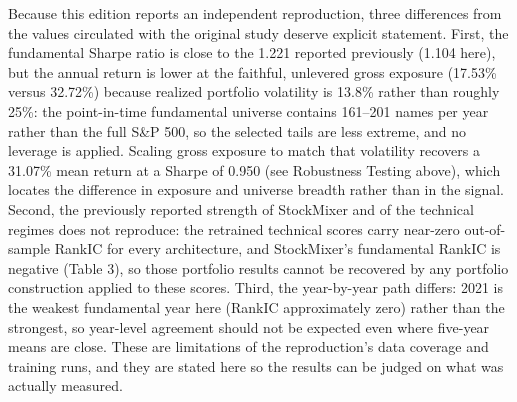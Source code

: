 \documentclass[12pt]{article}
\begin{document}
Because this edition reports an independent reproduction, three differences from the values circulated with the original study deserve explicit statement. First, the fundamental Sharpe ratio is close to the 1.221 reported previously (1.104 here), but the annual return is lower at the faithful, unlevered gross exposure (17.53\% versus 32.72\%) because realized portfolio volatility is 13.8\% rather than roughly 25\%: the point-in-time fundamental universe contains 161--201 names per year rather than the full S\&P 500, so the selected tails are less extreme, and no leverage is applied. Scaling gross exposure to match that volatility recovers a 31.07\% mean return at a Sharpe of 0.950 (see Robustness Testing above), which locates the difference in exposure and universe breadth rather than in the signal. Second, the previously reported strength of StockMixer and of the technical regimes does not reproduce: the retrained technical scores carry near-zero out-of-sample RankIC for every architecture, and StockMixer's fundamental RankIC is negative (Table 3), so those portfolio results cannot be recovered by any portfolio construction applied to these scores. Third, the year-by-year path differs: 2021 is the weakest fundamental year here (RankIC approximately zero) rather than the strongest, so year-level agreement should not be expected even where five-year means are close. These are limitations of the reproduction's data coverage and training runs, and they are stated here so the results can be judged on what was actually measured.
\end{document}
